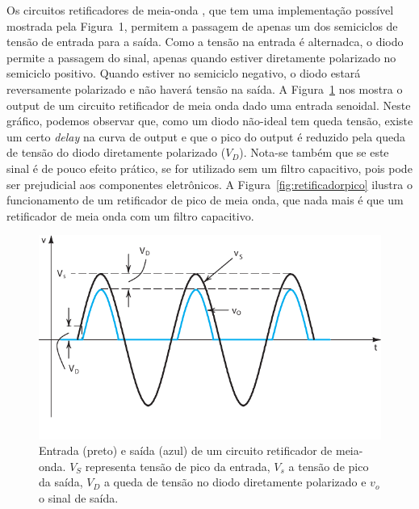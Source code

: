 \documentclass[12pt,a4paper]{article}
\begin{document}
Os circuitos retificadores de meia-onda , que tem uma implementação possível mostrada pela Figura~1, permitem a passagem de apenas um dos semiciclos de tensão de entrada para a saída. Como a tensão na entrada é alternadca, o diodo permite a passagem do sinal, apenas quando estiver diretamente polarizado no semiciclo positivo. Quando estiver no semiciclo negativo, o diodo estará reversamente polarizado e não haverá tensão na saída. A Figura~\ref{fig:meiaonda} nos mostra o output de um circuito retificador de meia onda dado uma entrada senoidal. Neste gráfico, podemos observar que, como um diodo não-ideal tem queda tensão, existe um certo \emph{delay} na curva de output e que o pico do output é reduzido pela queda de tensão do diodo diretamente polarizado ($V_{D}$). Nota-se também que se este sinal é de pouco efeito prático, se for utilizado sem um filtro capacitivo, pois pode ser prejudicial aos componentes eletrônicos. A Figura~\ref{fig:retificadorpico} ilustra o funcionamento de um retificador de pico de meia onda, que nada mais é que um retificador de meia onda com um filtro capacitivo.
\begin{figure}[htpb]
  \centering
  \includegraphics[width=0.8\linewidth]{./meiaonda.pdf}
  \caption{Entrada (preto) e saída (azul) de um circuito retificador de meia-onda. $V_S$ representa tensão de pico da entrada, $V_s$ a tensão de pico da saída, $V_D$ a queda de tensão no diodo diretamente polarizado e $v_o$ o sinal de saída.}
  \label{fig:meiaonda}
\end{figure}
\end{document}
